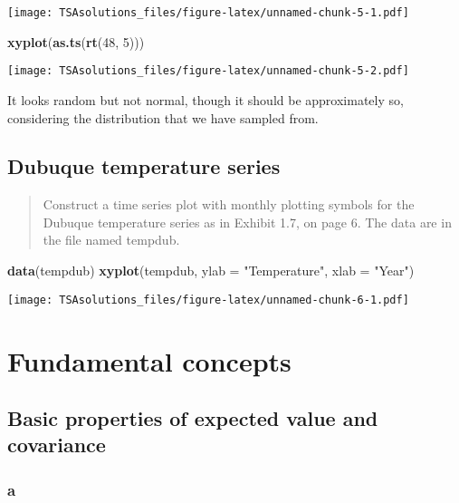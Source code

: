 \documentclass[]{book}
\newenvironment{Shaded}{\begin{snugshade}}{\end{snugshade}}
\newcommand{\KeywordTok}[1]{\textcolor[rgb]{0.13,0.29,0.53}{\textbf{{#1}}}}
\newcommand{\DataTypeTok}[1]{\textcolor[rgb]{0.13,0.29,0.53}{{#1}}}
\newcommand{\DecValTok}[1]{\textcolor[rgb]{0.00,0.00,0.81}{{#1}}}
\newcommand{\StringTok}[1]{\textcolor[rgb]{0.31,0.60,0.02}{{#1}}}
\newcommand{\NormalTok}[1]{{#1}}
\begin{document}
\texttt{[image: TSAsolutions\_files/figure-latex/unnamed-chunk-5-1.pdf]}

\begin{Shaded}
\begin{Highlighting}[]
\KeywordTok{xyplot}\NormalTok{(}\KeywordTok{as.ts}\NormalTok{(}\KeywordTok{rt}\NormalTok{(}\DecValTok{48}\NormalTok{, }\DecValTok{5}\NormalTok{)))}
\end{Highlighting}
\end{Shaded}

\texttt{[image: TSAsolutions\_files/figure-latex/unnamed-chunk-5-2.pdf]}

It looks random but not normal, though it should be approximately so,
considering the distribution that we have sampled from.

\section{Dubuque temperature series}\label{dubuque-temperature-series}

\begin{quote}
Construct a time series plot with monthly plotting symbols for the
Dubuque temperature series as in Exhibit 1.7, on page 6. The data are in
the file named tempdub.
\end{quote}

\begin{Shaded}
\begin{Highlighting}[]
\KeywordTok{data}\NormalTok{(tempdub)}
\KeywordTok{xyplot}\NormalTok{(tempdub, }\DataTypeTok{ylab =} \StringTok{"Temperature"}\NormalTok{, }\DataTypeTok{xlab =} \StringTok{"Year"}\NormalTok{)}
\end{Highlighting}
\end{Shaded}

\texttt{[image: TSAsolutions\_files/figure-latex/unnamed-chunk-6-1.pdf]}

\chapter{Fundamental concepts}\label{fundamental-concepts}

\section{Basic properties of expected value and
covariance}\label{basic-properties-of-expected-value-and-covariance}

\subsection*{a}\label{a}
\end{document}
